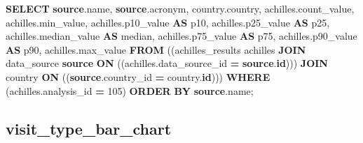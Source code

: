 \documentclass[
]{book}
\newenvironment{Shaded}{\begin{snugshade}}{\end{snugshade}}
\newcommand{\DecValTok}[1]{\textcolor[rgb]{0.00,0.00,0.81}{#1}}
\newcommand{\FunctionTok}[1]{\textcolor[rgb]{0.00,0.00,0.00}{#1}}
\newcommand{\KeywordTok}[1]{\textcolor[rgb]{0.13,0.29,0.53}{\textbf{#1}}}
\newcommand{\NormalTok}[1]{#1}
\newcommand{\OperatorTok}[1]{\textcolor[rgb]{0.81,0.36,0.00}{\textbf{#1}}}
\begin{document}
\begin{Shaded}
\begin{Highlighting}[]
\KeywordTok{SELECT} \KeywordTok{source}\NormalTok{.name,}
   \KeywordTok{source}\NormalTok{.acronym,}
\NormalTok{   country.country,}
\NormalTok{   achilles.count\_value,}
\NormalTok{   achilles.min\_value,}
\NormalTok{   achilles.p10\_value }\KeywordTok{AS}\NormalTok{ p10,}
\NormalTok{   achilles.p25\_value }\KeywordTok{AS}\NormalTok{ p25,}
\NormalTok{   achilles.median\_value }\KeywordTok{AS} \FunctionTok{median}\NormalTok{,}
\NormalTok{   achilles.p75\_value }\KeywordTok{AS}\NormalTok{ p75,}
\NormalTok{   achilles.p90\_value }\KeywordTok{AS}\NormalTok{ p90,}
\NormalTok{   achilles.max\_value}
  \KeywordTok{FROM}\NormalTok{ ((achilles\_results achilles}
    \KeywordTok{JOIN}\NormalTok{ data\_source }\KeywordTok{source}
      \KeywordTok{ON}\NormalTok{ ((achilles.data\_source\_id }\OperatorTok{=} \KeywordTok{source}\NormalTok{.}\KeywordTok{id}\NormalTok{)))}
    \KeywordTok{JOIN}\NormalTok{ country }\KeywordTok{ON}\NormalTok{ ((}\KeywordTok{source}\NormalTok{.country\_id }\OperatorTok{=}\NormalTok{ country.}\KeywordTok{id}\NormalTok{)))}
 \KeywordTok{WHERE}\NormalTok{ (achilles.analysis\_id }\OperatorTok{=} \DecValTok{105}\NormalTok{)}
 \KeywordTok{ORDER} \KeywordTok{BY} \KeywordTok{source}\NormalTok{.name;}
\end{Highlighting}
\end{Shaded}

\hypertarget{visit_type_bar_chart}{%
\subsection*{visit\_type\_bar\_chart}\label{visit_type_bar_chart}}
\end{document}
